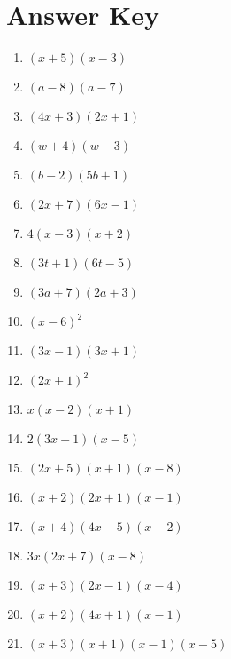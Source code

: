 \newpage

\section{Answer Key}

\begin{enumerate}
	\item $(x+5)(x-3)$
    \item $(a-8)(a-7)$
    \item $(4x+3)(2x+1)$
    \item $(w+4)(w-3)$
	\item $(b-2)(5b+1)$
    \item $(2x+7)(6x-1)$
    \item $4(x-3)(x+2)$
    \item $(3t+1)(6t-5)$
    \item $(3a+7)(2a+3)$
    \item $(x-6)^2$
    \item $(3x-1)(3x+1)$
    \item $(2x+1)^2$
    \item $x(x-2)(x+1)$
    \item $2(3x-1)(x-5)$
    \item $(2x+5)(x+1)(x-8)$
    \item $(x+2)(2x+1)(x-1)$
    \item $(x+4)(4x-5)(x-2)$
    \item $3x(2x+7)(x-8)$
    
    \item $(x+3)(2x-1)(x-4)$
    \item $(x+2)(4x+1)(x-1)$
    \item $(x+3)(x+1)(x-1)(x-5)$
\end{enumerate}